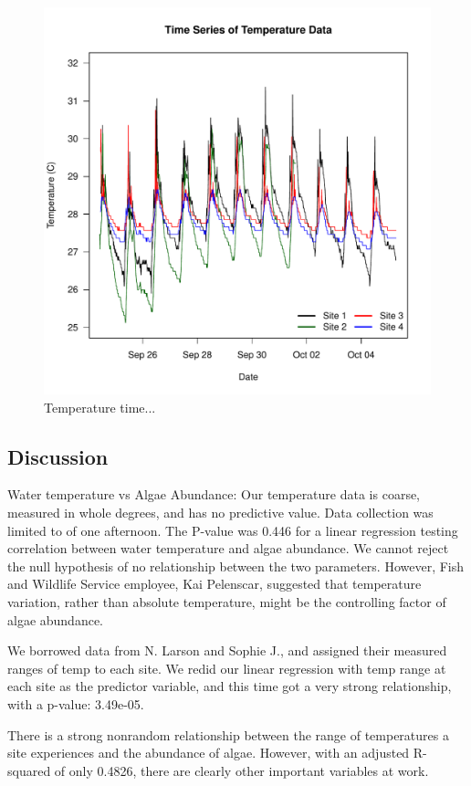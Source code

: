 \documentclass{article}
\begin{document}
\begin{figure}
\includegraphics{Figures/Temp}
\caption{Temperature time...}
\label{Temp}
\end{figure}

\subsection{Discussion}

Water temperature vs Algae Abundance: Our temperature data is coarse, measured in whole degrees, and has no predictive value. Data collection was limited to of one afternoon. The P-value was 0.446 for a linear regression testing correlation between water temperature and algae abundance. 
We cannot reject the null hypothesis of no relationship between the two parameters.
However, Fish and Wildlife Service employee, Kai Pelenscar, suggested that temperature variation, rather than absolute temperature, might be the  controlling factor of algae abundance. 


We borrowed data from N. Larson and Sophie J., and assigned their measured ranges of temp to each site. We redid our linear regression with temp range at each site as the predictor variable, and this time got a very strong relationship, with a p-value: 3.49e-05.


There is a strong nonrandom relationship between the range of temperatures a site experiences and the abundance of algae. However, with an adjusted R-squared of only 0.4826, there are clearly other important variables at work.
\end{document}
